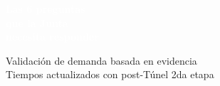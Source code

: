 \documentclass[aspectratio=169, 11pt]{beamer}
\begin{document}
{
\begin{frame}[plain]
\vfill
\begin{center}
{\Huge\bfseries\textcolor{white}{Las 6 preguntas\\[8pt]que la Junta\\[8pt]necesita responder}}

\vspace{20pt}

\vspace{14pt}
{\normalsize\textcolor{white!80}{Validación de demanda basada en evidencia\\Tiempos actualizados con post-Túnel 2da etapa}}
\end{center}
\vfill
\end{frame}
}
\end{document}
